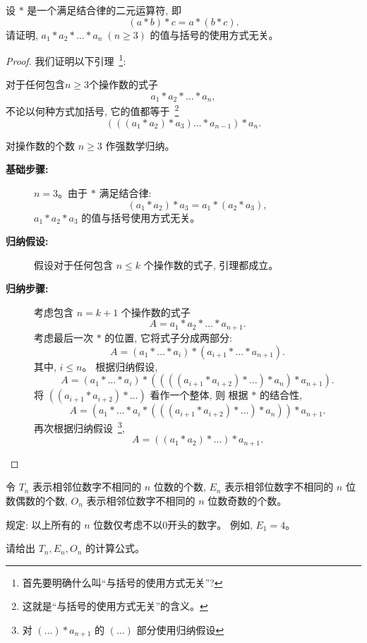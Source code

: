 \documentclass[a4paper, justified]{tufte-handout}
\begin{document}
\begin{problem}
  设 $\ast$ 是一个满足结合律的二元运算符, 即
  \[
    (a \ast b) \ast c = a \ast (b \ast c).
  \]
  请证明, $a_{1} \ast a_{2} \ast \dots \ast a_{n}\; (n \ge 3)$
  的值与括号的使用方式无关。
\end{problem}

\begin{proof}
  我们证明以下引理~\footnote{首先要明确什么叫``与括号的使用方式无关''?}:
  \begin{lemma*}
    对于任何包含$n \ge 3$个操作数的式子
    \[
      a_{1} \ast a_{2} \ast \dots \ast a_{n},
    \]
    不论以何种方式加括号, 它的值都等于~\footnote{这就是``与括号的使用方式无关''的含义。}
    \[
      (((a_{1} \ast a_{2}) \ast a_{3}) \dots \ast a_{n-1}) \ast a_{n}.
    \]
  \end{lemma*}

  \vspace{1em}
  \noindent 对操作数的个数 $n \ge 3$ 作强数学归纳。
  \begin{description}
    \item[{\bf 基础步骤:}] $n = 3$。由于 $\ast$ 满足结合律:
      \[
        (a_{1} \ast a_{2}) \ast a_{3} = a_{1} \ast (a_{2} \ast a_{3}),
      \]
      $a_{1} \ast a_{2} \ast a_{3}$ 的值与括号使用方式无关。
    \item[{\bf 归纳假设:}] 假设对于任何包含 $n \le k$ 个操作数的式子, 引理都成立。
    \item[{\bf 归纳步骤:}] 考虑包含 $n = k + 1$ 个操作数的式子
      \[
        A = a_{1} \ast a_{2} \ast \dots \ast a_{n+1}.
      \]
      考虑最后一次 $\ast$ 的位置, 它将式子分成两部分:
      \[
        A = (a_{1} \ast \dots \ast a_{i}) \ast (a_{i+1} \ast \dots \ast a_{n+1}).
      \]
      其中, $i \le n$。
      根据归纳假设,
      \[
        A = (a_{1} \ast \dots \ast a_{i}) \ast
          (\boxed{(((a_{i+1} \ast a_{i+2}) \ast \dots) \ast a_{n})} \ast a_{n+1}).
      \]
      将 $((a_{i+1} \ast a_{i+2}) \ast \dots)$ 看作一个整体, 则
      根据 $\ast$ 的结合性,
      \[
        A = (a_{1} \ast \dots \ast a_{i} \ast
          \boxed{(((a_{i+1} \ast a_{i+2}) \ast \dots) \ast a_{n})}) \ast a_{n+1}.
      \]
      再次根据归纳假设~\footnote{对 $(\dots) \ast a_{n+1}$ 的 $(\dots)$ 部分使用归纳假设},
      \[
        A = ((a_{1} \ast a_{2}) \ast \dots) \ast a_{n+1}.
      \]
  \end{description}
\end{proof}

\begin{problem}
  令 $T_{n}$ 表示相邻位数字不相同的 $n$ 位数的个数,
  $E_{n}$ 表示相邻位数字不相同的 $n$ 位数偶数的个数,
  $O_{n}$ 表示相邻位数字不相同的 $n$ 位数奇数的个数。

  \noindent 规定: 以上所有的 $n$ 位数仅考虑不以0开头的数字。
  例如, $E_{1} = 4$。

  \noindent 请给出 $T_{n}, E_{n}, O_{n}$ 的计算公式。
\end{problem}
\end{document}
